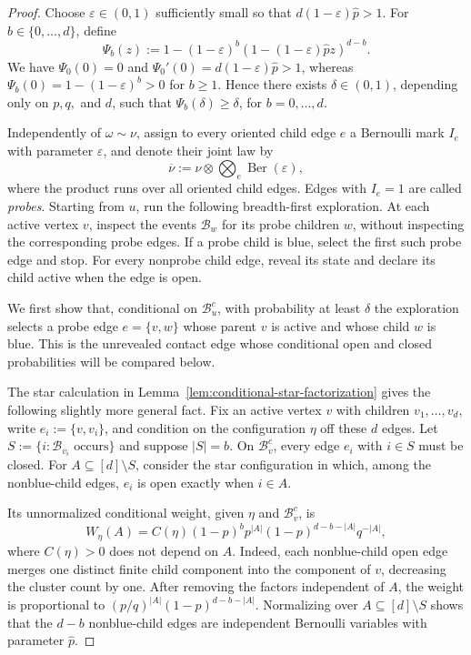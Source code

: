 \documentclass[11pt]{amsart}
\theoremstyle{plain}
\theoremstyle{definition}
\theoremstyle{remark}
\begin{document}
\begin{proof}
Choose $\varepsilon\in(0,1)$ sufficiently small so that $d(1-\varepsilon)\widehat p>1$. For $b\in\{0,\ldots,d\}$, define
\[
    \Psi_b(z)
    :=
    1-(1-\varepsilon)^b
    \left(
        1-(1-\varepsilon)\widehat p z
    \right)^{d-b}.
\]
We have $\Psi_0(0)=0$ and $\Psi_0'(0)=d(1-\varepsilon)\widehat p>1$, whereas $\Psi_b(0)=1-(1-\varepsilon)^b>0$ for $b\ge1$. Hence there exists $\delta\in(0,1)$, depending only on $p,q,$ and $d$, such that $\Psi_b(\delta)\ge\delta$, for $b=0,\ldots,d$.

Independently of $\omega\sim\nu$, assign to every oriented child edge $e$ a Bernoulli mark $I_e$ with parameter $\varepsilon$, and denote their joint law by
\[
    \overline\nu
    :=
    \nu
    \otimes
    \bigotimes_e \operatorname{Ber}(\varepsilon),
\]
where the product runs over all oriented child edges. Edges with $I_e=1$ are called \emph{probes}. Starting from $u$, run the following breadth-first exploration. At each active vertex $v$, inspect the events $\mathcal B_w$ for its probe children $w$, without inspecting the corresponding probe edges. If a probe child is blue, select the first such probe edge and stop. For every nonprobe child edge, reveal its state and declare its child active when the edge is open.

We first show that, conditional on $\mathcal B_u^c$, with probability at least $\delta$ the exploration selects a probe edge $e=\{v,w\}$ whose parent $v$ is active and whose child $w$ is blue. This is the unrevealed contact edge whose conditional open and closed probabilities will be compared below.

The star calculation in Lemma~\ref{lem:conditional-star-factorization} gives the following slightly more general fact. Fix an active vertex $v$ with children $v_1,\ldots,v_d$, write $e_i:=\{v,v_i\}$, and condition on the configuration $\eta$ off these $d$ edges. Let $S:=\{i:\mathcal B_{v_i}\text{ occurs}\}$ and suppose $|S|=b$. On $\mathcal B_v^c$, every edge $e_i$ with $i\in S$ must be closed. For $A\subseteq[d]\setminus S$, consider the star configuration in which, among the nonblue-child edges, $e_i$ is open exactly when $i\in A$. 

Its unnormalized conditional weight, given $\eta$ and $\mathcal B_v^c$, is
\[
    W_\eta(A)
    =
    C(\eta)
    (1-p)^b
    p^{|A|}
    (1-p)^{d-b-|A|}
    q^{-|A|},
\]
where $C(\eta)>0$ does not depend on $A$. Indeed, each nonblue-child open edge merges one distinct finite child component into the component of $v$, decreasing the cluster count by one. After removing the factors independent of $A$, the weight is proportional to $\left(p/q\right)^{|A|}(1-p)^{d-b-|A|}$. Normalizing over $A\subseteq[d]\setminus S$ shows that the $d-b$ nonblue-child edges are independent Bernoulli variables with parameter $\widehat p$.


\end{proof}
\end{document}
